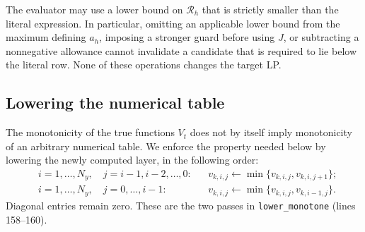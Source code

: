 The evaluator may use a lower bound on $\mathcal R_h$ that is strictly
smaller than the literal expression.  In particular, omitting an
applicable lower bound from the maximum defining $a_h$, imposing a
stronger guard before using $J$, or subtracting a nonnegative allowance
cannot invalidate a candidate that is required to lie below the literal
row.  None of these operations changes the target LP.

\subsection{Lowering the numerical table}
\label{sec:cert-iid-lowering}

The monotonicity of the true functions $V_t$ does not by itself imply
monotonicity of an arbitrary numerical table.  We enforce the property
needed below by lowering the newly computed layer, in the following
order:
\begin{align*}
 &i=1,\ldots,N_y,\quad j=i-1,i-2,\ldots,0:
       &&v_{k,i,j}\leftarrow\min\{v_{k,i,j},v_{k,i,j+1}\};\\
 &i=1,\ldots,N_y,\quad j=0,\ldots,i-1:
       &&v_{k,i,j}\leftarrow\min\{v_{k,i,j},v_{k,i-1,j}\}.
\end{align*}
Diagonal entries remain zero.  These are the two passes in
\texttt{lower\_monotone} (lines 158--160).

